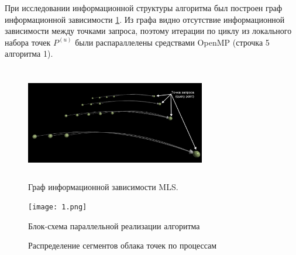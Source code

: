 При исследовании информационной структуры алгоритма был построен граф информационной зависимости \ref{fig:information}. Из графа видно отсутствие информационной зависимости между точками запроса, поэтому итерации по циклу из локального набора точек $P^{(u)}$ были распараллелены средствами OpenMP (строчка 5 алгоритма 1). 

\begin{figure}[h]
    \centering
    \includegraphics[width=0.7\textwidth, height=5cm]{images/graph.png}
    \caption{Граф информационной зависимости MLS.}
    \label{fig:information}
\end{figure}

\begin{figure}[h]
    \centering
    \texttt{[image: 1.png]}
    \caption{Блок-схема параллельной реализации алгоритма}
    \label{fig:mesh1}
\end{figure}


\begin{figure}[h]
  \centering
  \caption{Распределение сегментов облака точек по процессам}
  \label{fig:decomposition}
\end{figure}

